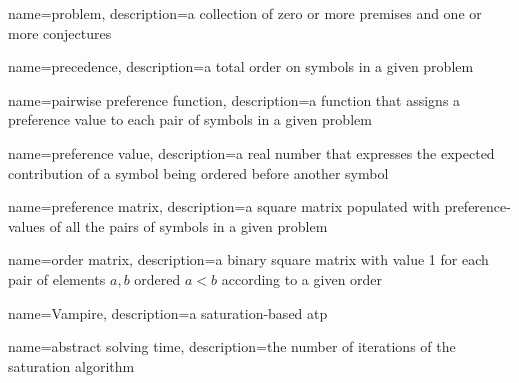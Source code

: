 \usepackage{glossaries}
\makeglossaries


{
	name=problem,
	description={a collection of zero or more premises and one or more conjectures}
}

{
	name=precedence,
	description={a total order on symbols in a given \gls{problem}}
}

{
	name=pairwise preference function,
	description={a function that assigns a preference value to each pair of symbols in a given problem}
}

{
	name=preference value,
	description={a real number that expresses the expected contribution of a symbol being ordered before another symbol}
}

{
	name=preference matrix,
	description={a square matrix populated with \glspl{preference-value} of all the pairs of symbols in a given \gls{problem}}
}

{
	name=order matrix,
	description={a binary square matrix with value 1 for each pair of elements \(a, b\) ordered \(a < b\) according to a given order}
}

{
	name=Vampire,
	description={a saturation-based \gls{atp} \cite{Kovacs2013}}
}

{
	name=abstract solving time,
	description={the number of iterations of the saturation algorithm}
}
